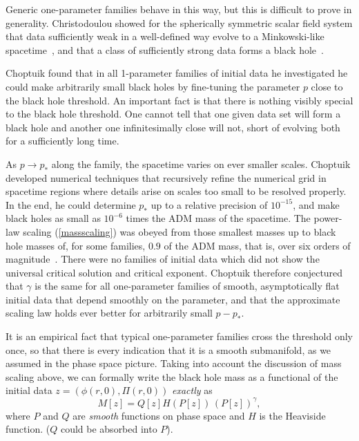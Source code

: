 \documentclass{article}
\begin{document}
Generic one-parameter families behave in this way, but this is
difficult to prove in generality. Christodoulou showed for the
spherically symmetric scalar field system that data sufficiently weak
in a well-defined way evolve to a Minkowski-like
spacetime~\cite{Christodoulou0a, Christodoulou3}, and that a class of
sufficiently strong data forms a black hole~\cite{Christodoulou2}. 

Choptuik found that in all 1-parameter families of initial data he
investigated he could make arbitrarily small black holes by
fine-tuning the parameter $p$ close to the black hole threshold. An
important fact is that there is nothing visibly special to the black
hole threshold. One cannot tell that one given data set will form a
black hole and another one infinitesimally close will not, short of
evolving both for a sufficiently long time. 

As $p\to p_*$ along the family, the spacetime varies on ever smaller
scales. Choptuik developed numerical techniques that recursively
refine the numerical grid in spacetime regions where details arise on
scales too small to be resolved properly. In the end, he could
determine $p_*$ up to a relative precision of $10^{-15}$, and make
black holes as small as $10^{-6}$ times the ADM mass of the
spacetime. The power-law scaling (\ref{massscaling}) was obeyed from
those smallest masses up to black hole masses of, for some families,
$0.9$ of the ADM mass, that is, over six orders of
magnitude~\cite{Choptuik94}. There were no families of initial data
which did not show the universal critical solution and critical
exponent. Choptuik therefore conjectured that $\gamma$ is the same for
all one-parameter families of smooth, asymptotically flat initial data
that depend smoothly on the parameter, and that the approximate
scaling law holds ever better for arbitrarily small $p-p_*$.

It is an empirical fact that typical one-parameter families cross the
threshold only once, so that there is every indication that it is a
smooth submanifold, as we assumed in the phase space picture. Taking
into account the discussion of mass scaling above, we can formally
write the black hole mass as a functional of the initial data
$z=\left(\phi(r,0),\Pi(r,0)\right)$ {\em exactly} as
%
\begin{equation}
\label{PQ}
  M[z] = Q[z] H(P[z])\,(P[z])^\gamma, 
\end{equation}
%
where $P$ and $Q$ are {\em smooth} functions on phase space and $H$ is
the Heaviside function. ($Q$ could be absorbed into $P$).
\end{document}
